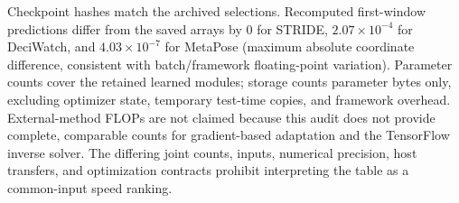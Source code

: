 \documentclass[11pt,letterpaper]{article}
\begin{document}
Checkpoint hashes match the archived selections. Recomputed first-window predictions differ from the saved arrays by 0 for STRIDE, $2.07\times10^{-4}$ for DeciWatch, and $4.03\times10^{-7}$ for MetaPose (maximum absolute coordinate difference, consistent with batch/framework floating-point variation). Parameter counts cover the retained learned modules; storage counts parameter bytes only, excluding optimizer state, temporary test-time copies, and framework overhead. External-method FLOPs are not claimed because this audit does not provide complete, comparable counts for gradient-based adaptation and the TensorFlow inverse solver. The differing joint counts, inputs, numerical precision, host transfers, and optimization contracts prohibit interpreting the table as a common-input speed ranking.





\end{document}
